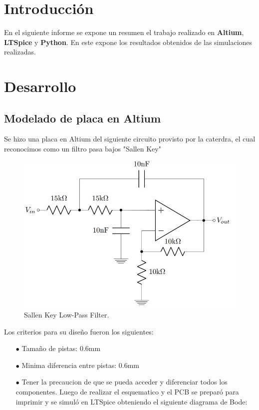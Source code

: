 \documentclass[a4paper]{article}
\begin{document}




\section*{Introducción}

En el siguiente informe se expone un resumen el trabajo realizado en \textbf{Altium}, \textbf{LTSpice} y \textbf{Python}. En este expone los resultados obtenidos de las simulaciones realizadas.

\section*{Desarrollo}

\subsection*{Modelado de placa en Altium}
Se hizo una placa en Altium del siguiente circuito provisto por la caterdra, el cual reconocimos como un filtro pasa bajos "Sallen Key"


\begin{figure}[H]
	\centering
	\includegraphics[width=\textwidth]{Altium}
	\caption{Sallen Key Low-Pass Filter.}
	\label{fig:LTSD1}
\end{figure}
Los criterios para su diseño fueron los siguientes:
\begin{itemize}
\item[$\bullet$]Tamaño de pistas: 0.6mm
\item[$\bullet$]Minima diferencia entre pistas: 0.6mm
\item[$\bullet$]Tener la precaucion de que se pueda acceder y diferenciar todos los componentes.
Luego de realizar el esquematico y el PCB se preparó para imprimir y se simuló en LTSpice obteniendo el siguiente diagrama de Bode:



\end{itemize} 
\end{document}
